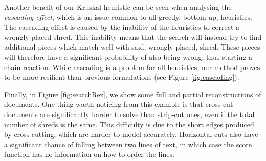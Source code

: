 \documentclass{llncs}
\begin{document}
Another benefit of our Kruskal heuristic can be seen when analysing the \emph{cascading effect}, which is an issue common to all greedy, bottom-up, heuristics. The cascading effect is caused by the inability of the heuristics to correct a wrongly placed shred. This inability means that the search will instead try to find additional pieces which match well with said, wrongly placed, shred. These pieces will therefore have a significant probability of also being wrong, thus starting a chain reaction. While cascading is a problem for all heuristics, our method proves to be more resilient than previous formulations (see Figure \ref{fig:cascading}).

Finally, in Figure \ref{fig:searchRez}, we show some full and partial reconstructions of documents. One thing worth noticing from this example is that cross-cut documents are significantly harder to solve than strip-cut ones, even if the total number of shreds is the same. This difficulty is due to the short edges produced by cross-cutting, which are harder to model accurately. Horizontal cuts also have a significant chance of falling between two lines of text, in which case the score function has no information on how to order the lines.
\end{document}
